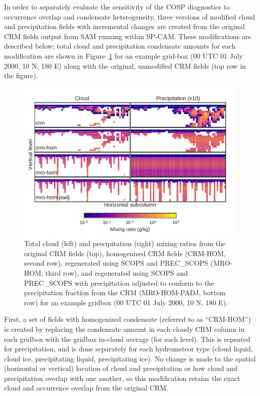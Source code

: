 In order to separately evaluate the sensitivity of the COSP diagnostics
to occurrence overlap and condensate heterogeneity, three versions of
modified cloud and precipitation fields with incremental changes are
created from the original CRM fields output from SAM running within
SP-CAM. These modifications are described below; total cloud and
precipitation condensate amounts for each modification are shown in
Figure~\ref{fig:mxratioExampleMro} for an example grid-box (00 UTC 01
July 2000, 10 N, 180 E) along with the original, unmodified CRM fields
(top row in the figure).

\begin{figure}[htbp]
\centering
\includegraphics{graphics/subgrid1_mxratio_example.pdf}
\caption{\label{fig:mxratioExampleMro}Total cloud (left) and
precipitation (right) mixing ratios from the original CRM fields (top),
homogenized CRM fields (CRM-HOM, second row), regenerated using SCOPS
and PREC\_SCOPS (MRO-HOM, third row), and regenerated using SCOPS and
PREC\_SCOPS with precipitation adjusted to conform to the precipitation
fraction from the CRM (MRO-HOM-PADJ, bottom row) for an example gridbox
(00 UTC 01 July 2000, 10 N, 180 E).}\label{fig:mxratioExampleMro}
\end{figure}

First, a set of fields with homogenized condensate (referred to as
``CRM-HOM'') is created by replacing the condensate amount in each
cloudy CRM column in each gridbox with the gridbox in-cloud average (for
each level). This is repeated for precipitation, and is done separately
for each hydrometeor type (cloud liquid, cloud ice, precipitating
liquid, precipitating ice). No change is made to the spatial (horizontal
or vertical) location of cloud and precipitation or how cloud and
precipitation overlap with one another, so this modification retains the
exact cloud and occurrence overlap from the original CRM.

